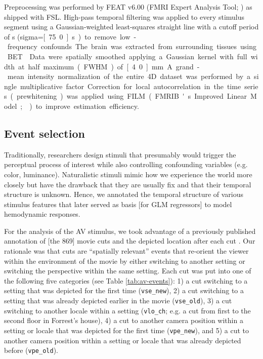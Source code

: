 \documentclass[english]{article}
\begin{document}
Preprocessing was performed by FEAT v6.00 (FMRI Expert Analysis Tool;
\citep{woolrich2001autocorr}) as shipped with FSL.
High-pass temporal filtering was applied to every stimulus segment using a
Gaussian-weighted least-squares straight line with a cutoff period of
\unit[150]{s} (sigma=\unit[75.0]{s}) to remove low-frequency confounds.
The brain was extracted from surrounding tissues using BET \citep{smith2002bet}.
Data were spatially smoothed applying a Gaussian kernel with full width at half
maximum (FWHM) of \unit[4.0]{mm}.
A grand-mean intensity normalization of the entire 4D dataset was performed by a
single multiplicative factor.
Correction for local autocorrelation in the time series (prewhitening) was
applied using FILM (FMRIB's Improved Linear Model; \citep{woolrich2001autocorr})
to improve estimation efficiency.


\subsection{Event selection} \label{rationale}

Traditionally, researchers design stimuli that presumably would trigger the
perceptual process of interest while also controlling confounding variables
(e.g. color, luminance).
Naturalistic stimuli mimic how we experience the world more closely but have the
drawback that they are usually fix and that their temporal structure is unknown.
Hence, we annotated the temporal structure of various stimulus features that
later served as basis [for GLM regressors] to model hemodynamic responses.

For the analysis of the AV stimulus, we took advantage of a previously published
annotation of [the 869] movie cuts and the depicted location after each cut
\citep{haeusler2016cutanno}.
Our rationale was that cuts are ``spatially relevant'' events that re-orient the
viewer within the environment of the movie by either switching to another
setting or switching the perspective within the same setting.
Each cut was put into one of the following five categories (see Table
\ref{tab:av-events}):
%
1) a cut switching to a setting that was depicted for the first time
(\texttt{vse\_new}),
%
2) a cut switching to a setting that was already depicted earlier in the movie
(\texttt{vse\_old}),
%
3) a cut switching to another locale within a setting (\texttt{vlo\_ch}; e.g. a
cut from first to the second floor in Forrest's house),
%
4) a cut to another camera position within a setting or locale that was depicted
for the first time (\texttt{vpe\_new}), and
%
5) a cut to another camera position within a setting or locale that was already
depicted before (\texttt{vpe\_old}).
\end{document}
